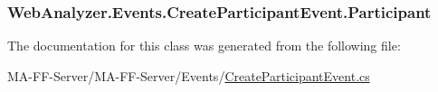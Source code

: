 \subsubsection[{Participant}]{ Web\+Analyzer.\+Events.\+Create\+Participant\+Event.\+Participant\hspace{0.3cm}{\ttfamily [get]}}\label{class_web_analyzer_1_1_events_1_1_create_participant_event_a33ceb02517db8c73eac1753aedc7823c}


The documentation for this class was generated from the following file\+:\begin{DoxyCompactItemize}
\item 
M\+A-\/\+F\+F-\/\+Server/\+M\+A-\/\+F\+F-\/\+Server/\+Events/\hyperlink{_create_participant_event_8cs}{Create\+Participant\+Event.\+cs}\end{DoxyCompactItemize}
